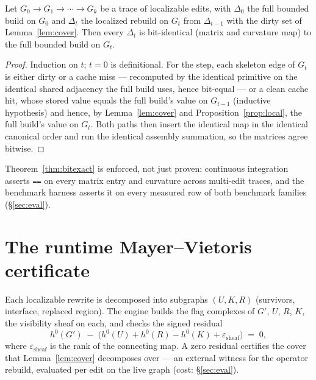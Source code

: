 \begin{theorem}\label{thm:bitexact}
Let $G_0 \to G_1 \to \cdots \to G_k$ be a trace of localizable edits, with
$\Delta_0$ the full bounded build on $G_0$ and
$\Delta_t$ the localized rebuild on $G_t$ from $\Delta_{t-1}$ with the dirty
set of Lemma~\ref{lem:cover}. Then every $\Delta_t$ is bit-identical
(matrix and curvature map) to the full bounded build on $G_t$.
\end{theorem}

\begin{proof}
Induction on $t$; $t{=}0$ is definitional. For the step, each skeleton edge
of $G_t$ is either dirty or a cache miss --- recomputed by the identical
primitive on the identical shared adjacency the full build uses, hence
bit-equal --- or a clean cache hit, whose stored value equals the full
build's value on $G_{t-1}$ (inductive hypothesis) and hence, by
Lemma~\ref{lem:cover} and Proposition~\ref{prop:local}, the full build's
value on $G_t$. Both paths then insert the identical map in the identical
canonical order and run the identical assembly summation, so the matrices
agree bitwise.
\end{proof}

\begin{remark}
Theorem~\ref{thm:bitexact} is enforced, not just proven: continuous
integration asserts \texttt{==} on every matrix entry and curvature across
multi-edit traces, and the benchmark harness asserts it on every measured
row of both benchmark families (\S\ref{sec:eval}).
\end{remark}

\section{The runtime Mayer--Vietoris certificate}\label{sec:certificate}

Each localizable rewrite is decomposed into subgraphs $(U, K, R)$ (survivors,
interface, replaced region). The engine builds the flag complexes of $G'$,
$U$, $R$, $K$, the visibility sheaf on each, and checks the signed residual
\[
h^0(G') \;-\; \bigl( h^0(U) + h^0(R) - h^0(K) + \varepsilon_{\mathrm{sheaf}}
\bigr) \;=\; 0,
\]
where $\varepsilon_{\mathrm{sheaf}}$ is the rank of the connecting map.
A zero residual certifies the cover that Lemma~\ref{lem:cover} decomposes
over --- an external witness for the operator rebuild, evaluated per edit on
the live graph (cost: \S\ref{sec:eval}).

